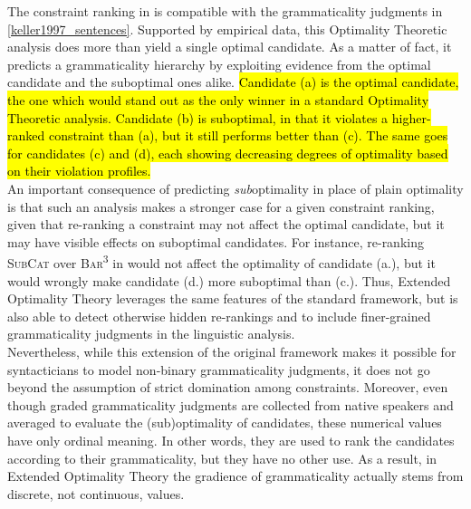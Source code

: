 The constraint ranking in  is compatible with the grammaticality judgments in \ref{keller1997_sentences}. Supported by empirical data, this Optimality Theoretic analysis does more than yield a single optimal candidate. As a matter of fact, it predicts a grammaticality hierarchy by exploiting evidence from the optimal candidate and the suboptimal ones alike. \hl{Candidate (a) is the optimal candidate, the one which would stand out as the only winner in a standard Optimality Theoretic analysis. Candidate (b) is suboptimal, in that it violates a higher-ranked constraint than (a), but it still performs better than (c). The same goes for candidates (c) and (d), each showing decreasing degrees of optimality based on their violation profiles.}\\
An important consequence of predicting \textit{sub}optimality in place of plain optimality is that such an analysis makes a stronger case for a given constraint ranking, given that re-ranking a constraint may not affect the optimal candidate, but it may have visible effects on suboptimal candidates. For instance, re-ranking \textsc{SubCat} over \textsc{Bar\textsuperscript{3}} in  would not affect the optimality of candidate (a.), but it would wrongly make candidate (d.) more suboptimal than (c.). Thus, Extended Optimality Theory leverages the same features of the standard framework, but is also able to detect otherwise hidden re-rankings and to include finer-grained grammaticality judgments in the linguistic analysis.\\
Nevertheless, while this extension of the original framework makes it possible for syntacticians to model non-binary grammaticality judgments, it does not go beyond the assumption of strict domination among constraints. Moreover, even though graded grammaticality judgments are collected from native speakers and averaged to evaluate the (sub)optimality of candidates, these numerical values have only ordinal meaning. In other words, they are used to rank the candidates according to their grammaticality, but they have no other use. As a result, in Extended Optimality Theory the gradience of grammaticality actually stems from discrete, not continuous, values.

